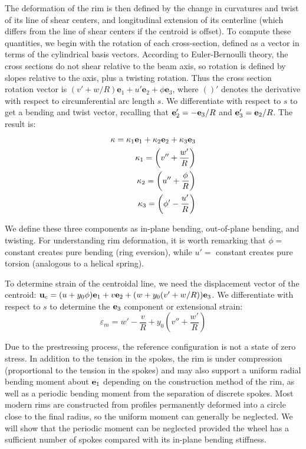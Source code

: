 \documentclass[\rootdir/thesis.tex]{subfiles}
\begin{document}
The deformation of the rim is then defined by the change in curvatures and twist of its line of shear centers, and longitudinal extension of its centerline (which differs from the line of shear centers if the centroid is offset). To compute these quantities, we begin with the rotation of each cross-section, defined as a vector in terms of the cylindrical basis vectors. According to Euler-Bernoulli theory, the cross sections do not shear relative to the beam axis, so rotation is defined by slopes relative to the axis, plus a twisting rotation. Thus the cross section rotation vector is $(v' + w/R) \mathbf{e}_1 + u' \mathbf{e}_2 + \phi\mathbf{e}_3$, where $()'$ denotes the derivative with respect to circumferential arc length $s$. We differentiate with respect to $s$ to get a bending and twist vector, recalling that $\mathbf{e}_2' = -\mathbf{e}_3/R$ and $\mathbf{e}_3' = \mathbf{e}_2/R$. The result is:
\begin{subequations}
\label{eq:kappa}
\begin{align}
\mathbf{\kappa} = \kappa_1\mathbf{e}_1 + \kappa_2\mathbf{e}_2 + \kappa_3\mathbf{e}_3\\
\kappa_1 = \left( v'' + \frac{w'}{R} \right) \label{eq:kappa1}\\
\kappa_2 = \left( u'' + \frac{\phi}{R} \right) \label{eq:kappa2}\\
\kappa_3 = \left( \phi' - \frac{u'}{R} \right) \label{eq:kappa3}
\end{align}
\end{subequations}

We define these three components as in-plane bending, out-of-plane bending, and twisting. For understanding rim deformation, it is worth remarking that $\phi=$ constant creates pure bending (ring eversion), while $u'=$ constant creates pure torsion (analogous to a helical spring).

To determine strain of the centroidal line, we need the displacement vector of the centroid: $\mathbf{u}_c = (u+y_0\phi)\mathbf{e}_1 + v\mathbf{e}_2 + (w+y_0 (v'+w/R))\mathbf{e}_3$. We differentiate with respect to $s$ to determine the $\mathbf{e}_3$ component or extensional strain:
\begin{equation}
\label{eq:mem_strain}
\varepsilon_m = w' - \frac{v}{R} + y_0\left(v'' + \frac{w'}{R} \right)
\end{equation}

Due to the prestressing process, the reference configuration is not a state of zero stress. In addition to the tension in the spokes, the rim is under compression\cite{Sharp1977} (proportional to the tension in the spokes) and may also support a uniform radial bending moment about $\mathbf{e}_1$ depending on the construction method of the rim, as well as a periodic bending moment from the separation of discrete spokes. Most modern rims are constructed from profiles permanently deformed into a circle close to the final radius, so the uniform moment can generally be neglected. We will show that the periodic moment can be neglected provided the wheel has a sufficient number of spokes compared with its in-plane bending stiffness.
\end{document}
